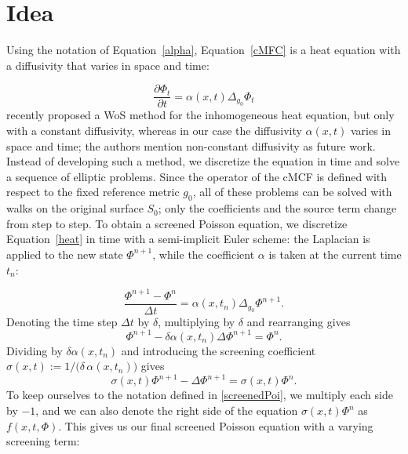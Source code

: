 \documentclass[
]{elteiktdk}[2024/04/26]
\begin{document}
	\section{Idea}
	
	Using the notation of Equation~\eqref{alpha}, Equation~\eqref{cMFC} is a heat equation with a diffusivity that varies in space and time:
	
	\begin{equation}
		\label{heat}
		\frac{\partial \Phi_t}{\partial t} = \alpha(x,t)\Delta_{g_0}\Phi_t
	\end{equation}
	\textcite{zhou2026gridfree} recently proposed a WoS method for the inhomogeneous heat equation, but only with a constant diffusivity, whereas in our case the diffusivity $\alpha(x,t)$ varies in space and time; the authors mention non-constant diffusivity as future work. Instead of developing such a method, we discretize the equation in time and solve a sequence of elliptic problems. Since the operator of the cMCF is defined with respect to the fixed reference metric $g_0$, all of these problems can be solved with walks on the original surface $S_0$; only the coefficients and the source term change from step to step.
	To obtain a screened Poisson equation, we discretize Equation~\eqref{heat} in time with a semi-implicit Euler scheme: the Laplacian is applied to the new state $\Phi^{n+1}$, while the coefficient $\alpha$ is taken at the current time $t_n$:
	
	\begin{equation}
		\frac{\Phi^{n+1} - \Phi^n}{\Delta t} = \alpha(x,t_n) \Delta_{g_0} \Phi^{n+1}.
	\end{equation}
	Denoting the time step $\Delta t$ by $\delta$, multiplying by $\delta$ and rearranging gives
	\begin{equation}
		\Phi^{n+1} - \delta \alpha(x,t_n)\Delta\Phi^{n+1} = \Phi^n.
	\end{equation}
	Dividing by $\delta\alpha(x,t_n)$ and introducing the screening coefficient $\sigma(x,t) := 1/\bigl(\delta\,\alpha(x,t_n)\bigr)$ gives
	\begin{equation}
		\sigma(x,t)\Phi^{n+1} - \Delta\Phi^{n+1} = \sigma(x,t)\Phi^n.
	\end{equation}
	To keep ourselves to the notation defined in \ref{screenedPoi}, we multiply each side by $-1$, and we can also denote the right side of the equation $\sigma(x,t)\Phi^n$ as $f(x,t,\Phi)$. This gives us our final screened Poisson equation with a varying screening term:
	
\end{document}
